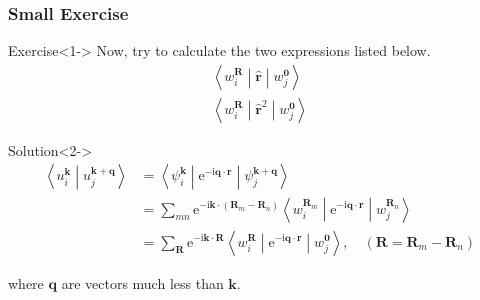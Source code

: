 \documentclass{beamer}
\begin{document}
  \begin{frame}
    \frametitle{Small Exercise}

    \begin{exampleblock}{Exercise}<1->
      \small
      Now, try to calculate the two expressions listed below.
      \begin{subequations}
        \begin{align}
          \left\langle{}w_i^{\mathbf{R}}\middle|\widehat{\mathbf{r}}\middle|{}w_j^{\mathbf{0}}\right\rangle\\
          \left\langle{}w_i^{\mathbf{R}}\middle|\widehat{\mathbf{r}}^2\middle|{}w_j^{\mathbf{0}}\right\rangle
        \end{align}
      \end{subequations}
    \end{exampleblock}
    
    \begin{block}{Solution}<2->
      \small
      \begin{equation*}
        \begin{aligned}
          \left\langle{}u_i^{\mathbf{k}}\middle|{}u_j^{\mathbf{k}+\mathbf{q}}\right\rangle &= \left\langle{}\psi_i^{\mathbf{k}}\middle|\mathrm{e}^{-\mathrm{i}\mathbf{q}\cdot\mathbf{r}}\middle|{}\psi_j^{\mathbf{k}+\mathbf{q}}\right\rangle\\
          &= \sum_{mn}\mathrm{e}^{-\mathrm{i}\mathbf{k}\cdot(\mathbf{R}_m-\mathbf{R}_n)}\left\langle{}w_i^{\mathbf{R}_m}\middle|\mathrm{e}^{-\mathrm{i}\mathbf{q}\cdot\mathbf{r}}\middle|{}w_j^{\mathbf{R}_n}\right\rangle\\
          &= \sum_{\mathbf{R}}\mathrm{e}^{-\mathrm{i}\mathbf{k}\cdot\mathbf{R}}\left\langle{}w_i^{\mathbf{R}}\middle|\mathrm{e}^{-\mathrm{i}\mathbf{q}\cdot\mathbf{r}}\middle|{}w_j^{\mathbf{0}}\right\rangle,\quad (\mathbf{R}=\mathbf{R}_m-\mathbf{R}_n)
        \end{aligned}
      \end{equation*}

      where \(\mathbf{q}\) are vectors much less than \(\mathbf{k}\).

      \end{block}

    \end{frame}
\end{document}
